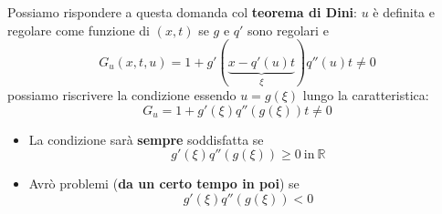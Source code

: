 \documentclass[10pt,a4paper,twoside,openright]{book}
\begin{document}
Possiamo rispondere a questa domanda col \textbf{teorema di Dini}: $u$ è definita e regolare come funzione di $(x,t)$ se $g$ e $q'$ sono regolari e
\begin{equation*}
    G_{u}(x,t,u) =1+g'(\underbrace{x-q'(u) t}_{\xi }) q''(u) t\neq 0
\end{equation*}
possiamo riscrivere la condizione essendo $\displaystyle u=g(\xi)$ lungo la caratteristica:
\begin{equation}
    \boxed{G_{u} =1+g'(\xi) q''(g(\xi)) t\neq 0}
\end{equation}
\begin{itemize}
    \item La condizione sarà \textbf{sempre} soddisfatta se
          \begin{equation*}
              g'(\xi) q''(g(\xi)) \geqslant 0\ \text{in} \ \mathbb{R}
              \label{eq:condizione-tutto-bene}
          \end{equation*}
    \item Avrò problemi (\textbf{da un certo tempo in poi}) se
          \begin{equation*}
              g'(\xi) q''(g(\xi)) < 0
          \end{equation*}
\end{itemize}
\end{document}
